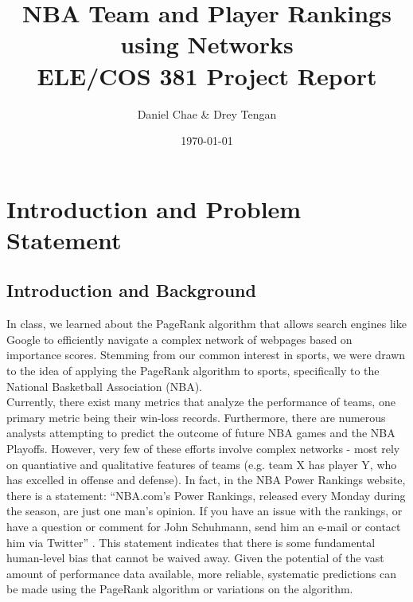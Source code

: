 \documentclass[12pt]{article}%
\begin{document}
\title{NBA Team and Player Rankings using Networks\\
\vspace{3 mm}
\large ELE/COS 381 Project Report}
\author{Daniel Chae \& Drey Tengan}
\date{\today}
\maketitle

\tableofcontents
\newpage
\section{Introduction and Problem Statement}
\subsection{Introduction and Background}
\null\quad\quad In class, we learned about the PageRank algorithm \cite{PageRank} that allows search engines like Google to efficiently navigate a complex network of webpages based on importance scores. Stemming from our common interest in sports, we were drawn to the idea of applying the PageRank algorithm to sports, specifically to the National Basketball Association (NBA).\\
\null\quad\quad Currently, there exist many metrics that analyze the performance of teams, one primary metric being their win-loss records. Furthermore, there are numerous analysts attempting to predict the outcome of future NBA games and the NBA Playoffs. However, very few of these efforts involve complex networks - most rely on quantiative and qualitative features of teams (e.g. team X has player Y, who has excelled in offense and defense). In fact, in the NBA Power Rankings website, there is a statement: ``NBA.com's Power Rankings, released every Monday during the season, are just one man's opinion. If you have an issue with the rankings, or have a question or comment for John Schuhmann, send him an e-mail or contact him via Twitter'' \cite{nbapowerrating}. This statement indicates that there is some fundamental human-level bias that cannot be waived away. Given the potential of the vast amount of performance data available, more reliable, systematic predictions can be made using the PageRank algorithm or variations on the algorithm.\\
\end{document}
